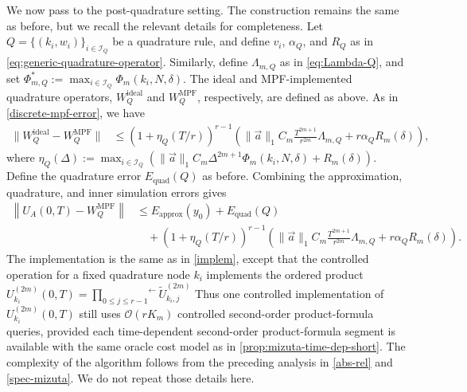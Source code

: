 \documentclass[10pt,reqno]{article}
\numberwithin{equation}{section}
\theoremstyle{plain}
\theoremstyle{definition}
\begin{document}
We now pass to the post-quadrature setting. The construction remains the same as before, but we recall the relevant details for completeness. Let \(Q=\{(k_i,w_i)\}_{i\in\mathcal I_Q}\) be a quadrature rule, and define \(v_i\), \(\alpha_Q\), and \(R_Q\) as in \cref{eq:generic-quadrature-operator}. Similarly, define \(\Lambda_{m,Q}\) as in \cref{eq:Lambda-Q}, and set \(\Phi_{m,Q}^{\ast} := \max_{i\in\mathcal I_Q}\Phi_m(k_i,N,\delta)\). The ideal and MPF-implemented quadrature operators, \(W_Q^{\operatorname{ideal}}\) and \(W_Q^{\operatorname{MPF}}\), respectively, are defined as above.  As in \cref{discrete-mpf-error}, we have
\begin{align}\label{eq:td-postquad-inner-error}
\| W_Q^{\operatorname{ideal}}-W_Q^{\operatorname{MPF}} \| &\le \left(1+\eta_Q(T/r)\right)^{r-1} \left( \|\vec a\|_1C_m \frac{T^{2m+1}}{r^{2m}} \Lambda_{m,Q} + r\alpha_QR_m(\delta) \right),
\end{align}
where \(\eta_Q(\Delta) := \max_{i \in \mathcal I_Q}\left(\|\vec a\|_1 C_m\Delta^{2m+1}\Phi_m(k_i,N,\delta) + R_m(\delta)\right)\). Define the quadrature error $ E_{\operatorname{quad}}(Q)$ as before. Combining the approximation, quadrature, and inner simulation errors gives
\begin{align}\label{eq:td-total-error-bound}
\left\| U_A(0,T)-W_Q^{\operatorname{MPF}} \right\| &\le E_{\operatorname{approx}}(y_0) + E_{\operatorname{quad}}(Q) \\ &\quad+ \left(1+\eta_Q(T/r)\right)^{r-1} \left( \|\vec a\|_1C_m \frac{T^{2m+1}}{r^{2m}} \Lambda_{m,Q} + r\alpha_QR_m(\delta) \right).
\end{align}
The implementation is the same as in \cref{implem}, except that the controlled operation for a fixed quadrature node \(k_i\) implements the ordered product $ U_{k_i}^{(2m)}(0,T) = \overset{\longleftarrow}{\prod_{0\leq j \leq r-1}} \widetilde U_{k_i,j}^{(2m)}$ Thus one controlled implementation of \(U_{k_i}^{(2m)}(0,T)\) still uses \(\mathcal O(rK_m)\) controlled second-order product-formula queries, provided each time-dependent second-order product-formula segment is available with the same oracle cost model as in \cref{prop:mizuta-time-dep-short}. The complexity of the algorithm follows from the preceding analysis in \cref{abs-rel} and \cref{spec-mizuta}. We do not repeat those details here.
\end{document}
